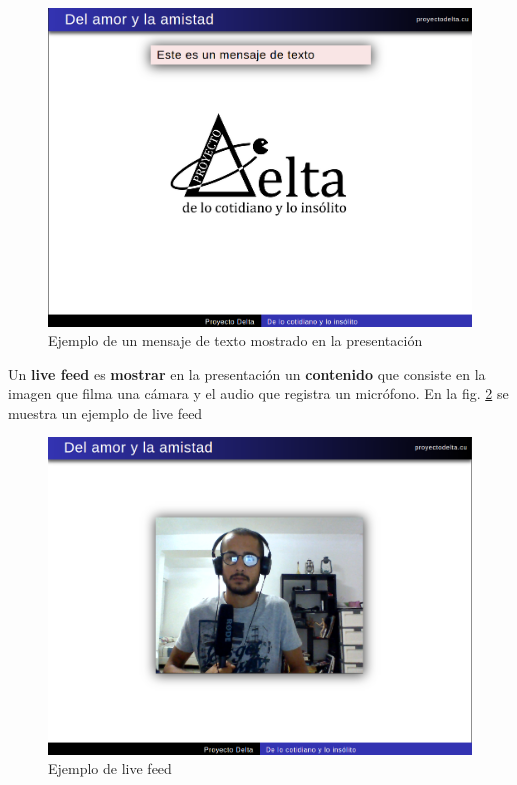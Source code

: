 	\begin{figure}[tb]
		\centering
		\includegraphics[width=12cm]{img/text_msg}
		\caption{Ejemplo de un mensaje de texto mostrado en la presentación}
		\label{fig:msg}
	\end{figure}

	\begin{definition}
		Un \textbf{live feed} es \textbf{mostrar} en la presentación un \textbf{contenido} que consiste en la imagen que filma una cámara y el audio que registra un micrófono. En la fig. \ref{fig:live_feed} se muestra un ejemplo de live feed
	\end{definition}

	\begin{figure}[tb]
		\centering
		\includegraphics[width=12cm]{img/live_feed}
		\caption{Ejemplo de live feed}
		\label{fig:live_feed}
	\end{figure}

